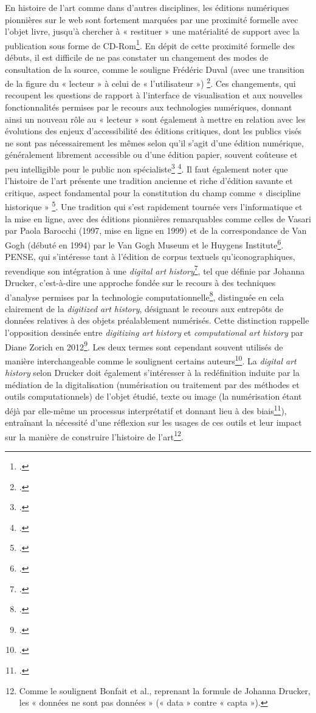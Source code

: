 En histoire de l’art comme dans d’autres disciplines, les éditions numériques pionnières sur le web sont fortement marquées par une proximité formelle avec l’objet livre, jusqu’à chercher à « restituer » une matérialité de support avec la publication sous forme de CD-Rom\footcite{earhart_digital_2012}. En dépit de cette proximité formelle des débuts, il est difficile de ne pas constater un changement des modes de consultation de la source, comme le souligne Frédéric Duval (avec une transition de la figure du « lecteur » à celui de « l’utilisateur ») \footcite[p.20]{duval_pour_2017}. Ces changements, qui recoupent les questions de rapport à l’interface de visualisation et aux nouvelles fonctionnalités permises par le recours aux technologies numériques, donnant ainsi un nouveau rôle au « lecteur » sont également à mettre en relation avec les évolutions des enjeux d’accessibilité des éditions critiques, dont les publics visés ne sont pas nécessairement les mêmes selon qu’il s’agit d’une édition numérique, généralement librement accessible ou d’une édition papier, souvent coûteuse et peu intelligible pour le public non spécialiste\footcite{duval_pour_2017}  \footcite{gvelesiani_quest-ce_2017}.
Il faut également noter que l’histoire de l’art présente une tradition ancienne et riche d’édition savante et critique, aspect fondamental pour la constitution du champ comme « discipline historique » \footcite{chateau-dutier_editions_2021}. Une tradition qui s’est rapidement tournée vers l’informatique et la mise en ligne, avec des éditions pionnières remarquables comme celles de Vasari par Paola Barocchi (1997, mise en ligne en 1999) et de la correspondance de Van Gogh (débuté en 1994) par le Van Gogh Museum et le Huygens Institute\footcite[p.78-80]{chateau-dutier_editions_2021}.  
PENSE, qui s’intéresse tant à l’édition de corpus textuels qu’iconographiques, revendique son intégration à une \textit{digital art history}\footcite{inha_produire_nodate}, tel que définie par Johanna Drucker, c’est-à-dire une approche fondée sur le recours à des techniques d’analyse permises par la technologie computationnelle\footcite[p.7]{drucker_is_2013}, distinguée en cela clairement de la \textit{digitized art history}, désignant le recours aux entrepôts de données relatives à des objets préalablement numérisés. Cette distinction rappelle l’opposition dessinée entre \textit{digitizing art history} et \textit{computational art history} par Diane Zorich en 2012\footcite[p.5]{bonfait_humanites_2021}. Les deux termes sont cependant souvent utilisés de manière interchangeable comme le soulignent certains auteurs\footcite[p.59]{aubry_artificial_2021}.
La \textit{digital art history} selon Drucker doit également s’intéresser à la redéfinition induite par la médiation de la digitalisation (numérisation ou traitement par des méthodes et outils computationnels) de l’objet étudié, texte ou image (la numérisation étant déjà par elle-même un processus interprétatif et donnant lieu à des biais\footcite[p.12]{drucker_is_2013}), entraînant la nécessité d’une réflexion sur les usages de ces outils et leur impact sur la manière de construire l’histoire de l’art\footnote{Comme le soulignent Bonfait et al., reprenant la formule de Johanna Drucker, les « données ne sont pas données » (« data » contre « capta »).}.

